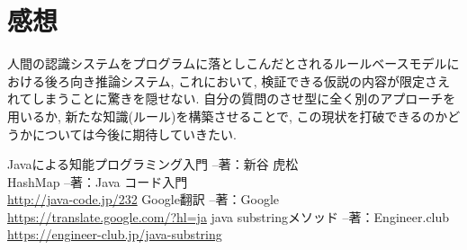 \documentclass[uplatex,12pt]{jsarticle}
\begin{document}
\section{感想}
人間の認識システムをプログラムに落としこんだとされるルールベースモデルにおける後ろ向き推論システム, これにおいて, 検証できる仮説の内容が限定さえれてしまうことに驚きを隠せない. 自分の質問のさせ型に全く別のアプローチを用いるか, 新たな知識(ルール)を構築させることで, この現状を打破できるのかどうかについては今後に期待していきたい. 

\begin{thebibliography}{99}
 Javaによる知能プログラミング入門 --著：新谷 虎松 \\
 HashMap --著：Java コード入門 \\
\url{http://java-code.jp/232}
 Google翻訳 --著：Google \\
\url{https://translate.google.com/?hl=ja}
 java substringメソッド --著：Engineer.club \\
\url{https://engineer-club.jp/java-substring}
\end{thebibliography}
\end{document}
